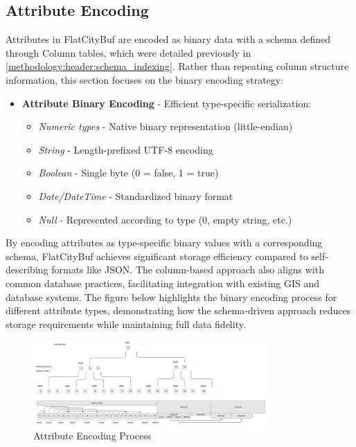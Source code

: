 \subsection{Attribute Encoding}
\label{methodology:feature_encoding:attribute_encoding}

Attributes in FlatCityBuf are encoded as binary data with a schema defined through Column tables, which were detailed previously in \autoref{methodology:header:schema_indexing}. Rather than repeating column structure information, this section focuses on the binary encoding strategy:

\begin{itemize}
  \item \textbf{Attribute Binary Encoding} - Efficient type-specific serialization:
    \begin{itemize}
      \item \textit{Numeric types} - Native binary representation (little-endian)
      \item \textit{String} - Length-prefixed UTF-8 encoding
      \item \textit{Boolean} - Single byte (0 = false, 1 = true)
      \item \textit{Date/DateTime} - Standardized binary format
      \item \textit{Null} - Represented according to type (0, empty string, etc.)
    \end{itemize}
\end{itemize}

By encoding attributes as type-specific binary values with a corresponding schema, FlatCityBuf achieves significant storage efficiency compared to self-describing formats like JSON. The column-based approach also aligns with common database practices, facilitating integration with existing GIS and database systems. The figure below highlights the binary encoding process for different attribute types, demonstrating how the schema-driven approach reduces storage requirements while maintaining full data fidelity.

\begin{figure}[h]
  \centering
  \includegraphics[width=0.8\textwidth]{figs/methodology/attribute_index.png}
  \caption{Attribute Encoding Process}
  \label{methodology:feature_encoding:attribute_encoding:figure}
\end{figure}

